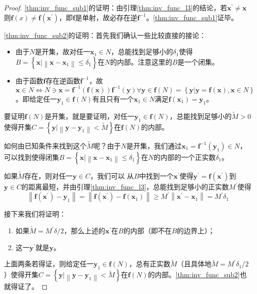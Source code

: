 \documentclass[../main.tex]{subfiles}
\begin{document}
\begin{proof}
    \ref{thm:inv_func_sub1}的证明：由引理\ref{thm:inv_func_l3}的结论，若$\mathbf{x}^\prime\neq\mathbf{x}$则$\mathbf{f}\left(x\right)\neq\mathbf{f}\left(\mathbf{x}^\prime\right)$，即$\mathbf{f}$是单射，故必存在逆$\mathbf{f}^{-1}$。\ref{thm:inv_func_sub1}证毕。

    \ref{thm:inv_func_sub2}的证明：首先我们确认一些比较直接的接论：
    \begin{itemize}
        \item 由于$N$是开集，故对任一$\mathbf{x}_1\in N$，总能找到足够小的$\delta_1$使得$B=\left\{\mathbf{x}|\left\|\mathbf{x}-\mathbf{x}_1\right\|\leq\delta_1\right\}$在$N$的内部。注意这里的$B$是一个闭集。
        \item 由于函数$\mathbf{f}$存在逆函数$\mathbf{f}^{-1}$，故$\mathbf{x}\in N\Leftrightarrow N\ni \mathbf{x}= \mathbf{f}^{-1}\left(\mathbf{f}\left(\mathbf{x}\right)\right)\mathbf{f}^{-1}\left(\mathbf{y}\right)\forall \mathbf{y}\in\mathbf{f}\left(N\right)=\left\{\mathbf{y}|\mathbf{y}=\mathbf{f}\left(\mathbf{x}\right),\mathbf{x}\in N\right\}$。即给定任一$\mathbf{y}_1\in\mathbf{f}\left(N\right)$有且只有一个$\mathbf{x}_1\in N$满足$\mathbf{f}\left(\mathbf{x}_1\right)=\mathbf{y}_1$。
    \end{itemize}

    要证明$\mathbf{f}\left(N\right)$是开集，就是要证明，对任一$\mathbf{y}_1\in\mathbf{f}\left(N\right)$，总能找到足够小的$\widetilde{M}>0$使得开集$C=\left\{\mathbf{y}|\left\|\mathbf{y}-\mathbf{y}_1\right\|<\widetilde{M}\right\}$在$\mathbf{f}\left(N\right)$的内部。

    如何由已知条件来找到这个$\widetilde{M}$呢？由于$N$是开集，我们通过$\mathbf{x}_1=\mathbf{f}^{-1}\left(\mathbf{y}_1\right)\in N$，可以找到使得闭集$B=\left\{\mathbf{x}|\left\|\mathbf{x}-\mathbf{x}_1\right\|\leq\delta_1\right\}$在$N$的内部的一个正实数$\delta_1$。

    如果$\widetilde{M}$存在，则对任一$\mathbf{y}\in C$，我们可以
    从$B$中找到一个$\mathbf{x}^\prime$使得$\mathbf{y}^\prime=\mathbf{f}\left(\mathbf{x}^\prime\right)$到$\mathbf{y}\in C$的距离最短，并由引理\ref{thm:inv_func_l3}，总能找到足够小的正实数$M^\prime$使得
    \[\left\|\mathbf{f}\left(\mathbf{x}^\prime\right)-\mathbf{y}_1\right\|=\left\|\mathbf{f}\left(\mathbf{x}^\prime\right)-\mathbf{f}\left(\mathbf{x}_1\right)\right\|\geq M^\prime\left\|\mathbf{x}^\prime-\mathbf{x}_1\right\|=M^\prime\delta_1
    \]

    接下来我们将证明：
    \begin{enumerate}[label=\roman*]
        \item\label{thm:inv_func_sub2_sub1} 如果$\widetilde{M}=M^\prime\delta/2$，那么上述的$\mathbf{x}^\prime$在$B$的内部（即不在$B$的边界上）；
        \item\label{thm:inv_func_sub2_sub2} 这一$\mathbf{y}^\prime$就是$\mathbf{y}$。
    \end{enumerate}
    上面两条若得证，则给定任一$\mathbf{y}_1\in\mathbf{f}\left(N\right)$，总有正实数$\widetilde{M}$（且具体地$\widetilde{M}=M^\prime\delta_1/2$）使得开集$C=\left\{\mathbf{y}|\left\|\mathbf{y}-\mathbf{y}_1\right\|<\widetilde{M}\right\}$在$\mathbf{f}\left(N\right)$的内部。\ref{thm:inv_func_sub2}也就得证了。


\end{proof}
\end{document}
